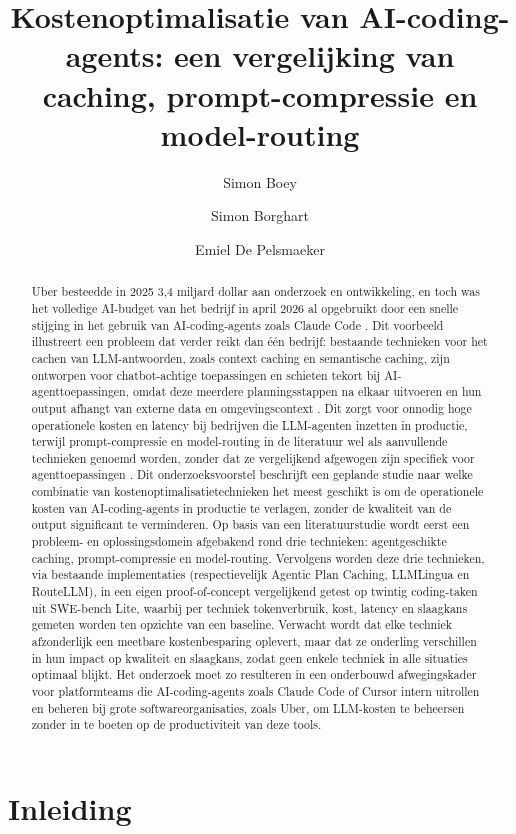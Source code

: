 \documentclass{hogent-article}
\title{Kostenoptimalisatie van AI-coding-agents: een vergelijking van caching, prompt-compressie en model-routing}
\author{Simon Boey}
\author{Simon Borghart}
\author{Emiel De Pelsmaeker}
\begin{document}
\begin{abstract}
  Uber besteedde in 2025 3,4 miljard dollar aan onderzoek en ontwikkeling, en toch was het volledige AI-budget van het bedrijf in april 2026 al opgebruikt door een snelle stijging in het gebruik van AI-coding-agents zoals Claude Code \autocite{Jain2026}. Dit voorbeeld illustreert een probleem dat verder reikt dan één bedrijf: bestaande technieken voor het cachen van LLM-antwoorden, zoals context caching en semantische caching, zijn ontworpen voor chatbot-achtige toepassingen en schieten tekort bij AI-agenttoepassingen, omdat deze meerdere planningsstappen na elkaar uitvoeren en hun output afhangt van externe data en omgevingscontext \autocite{Zhang2025}. Dit zorgt voor onnodig hoge operationele kosten en latency bij bedrijven die LLM-agenten inzetten in productie, terwijl prompt-compressie en model-routing in de literatuur wel als aanvullende technieken genoemd worden, zonder dat ze vergelijkend afgewogen zijn specifiek voor agenttoepassingen \autocite{Chen2024}. Dit onderzoeksvoorstel beschrijft een geplande studie naar welke combinatie van kostenoptimalisatietechnieken het meest geschikt is om de operationele kosten van AI-coding-agents in productie te verlagen, zonder de kwaliteit van de output significant te verminderen. Op basis van een literatuurstudie wordt eerst een probleem- en oplossingsdomein afgebakend rond drie technieken: agentgeschikte caching, prompt-compressie en model-routing. Vervolgens worden deze drie technieken, via bestaande implementaties (respectievelijk Agentic Plan Caching, LLMLingua en RouteLLM), in een eigen proof-of-concept vergelijkend getest op twintig coding-taken uit SWE-bench Lite, waarbij per techniek tokenverbruik, kost, latency en slaagkans gemeten worden ten opzichte van een baseline. Verwacht wordt dat elke techniek afzonderlijk een meetbare kostenbesparing oplevert, maar dat ze onderling verschillen in hun impact op kwaliteit en slaagkans, zodat geen enkele techniek in alle situaties optimaal blijkt. Het onderzoek moet zo resulteren in een onderbouwd afwegingskader voor platformteams die AI-coding-agents zoals Claude Code of Cursor intern uitrollen en beheren bij grote softwareorganisaties, zoals Uber, om LLM-kosten te beheersen zonder in te boeten op de productiviteit van deze tools.
\end{abstract}

\tableofcontents

\section{Inleiding}%
\label{sec:inleiding}
\end{document}
